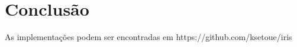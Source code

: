 \documentclass[
		12pt,				%
		openright,			%
		oneside,			%
		a4paper,			%
		chapter=TITLE,		%
		english,			%
		brazil				%
	]{abntex2}
\begin{document}















\chapter{Conclusão}

As implementações podem ser encontradas em https://github.com/ksetoue/iris







\end{document}

